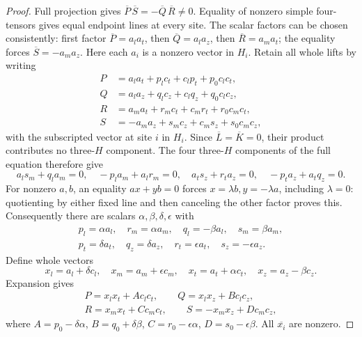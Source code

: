 \begin{proof}
Full projection gives
\(\overline P\,\overline S=-\overline Q\,\overline R\ne0\).
Equality of nonzero simple four-tensors gives equal endpoint lines at
every site.  The scalar factors can be chosen consistently: first factor
\(\overline P=a_la_t\), then \(\overline Q=a_la_z\), then
\(\overline R=a_ma_t\); the equality forces
\(\overline S=-a_ma_z\).  Here each \(a_i\) is a nonzero vector in \(H_i\).
Retain all whole lifts by writing
\[
\begin{aligned}
 P&=a_la_t+p_lc_t+c_lp_t+p_0c_lc_t,\\
 Q&=a_la_z+q_lc_z+c_lq_z+q_0c_lc_z,\\
 R&=a_ma_t+r_mc_t+c_mr_t+r_0c_mc_t,\\
 S&=-a_ma_z+s_mc_z+c_ms_z+s_0c_mc_z,
\end{aligned}
\]
with the subscripted vector at site \(i\) in \(H_i\).
Since \(\overline L=\overline K=0\), their product contributes no
three-\(H\) component.  The four three-\(H\) components of the full equation
therefore give
\[
 a_ls_m+q_la_m=0,\quad -p_la_m+a_lr_m=0,\quad
 a_ts_z+r_ta_z=0,\quad -p_ta_z+a_tq_z=0.
\]
For nonzero \(a,b\), an equality \(ax+yb=0\) forces
\(x=\lambda b,y=-\lambda a\), including \(\lambda=0\): quotienting by
either fixed line and then canceling the other factor proves this.
Consequently there are scalars \(\alpha,\beta,\delta,\epsilon\) with
\[
\begin{gathered}
 p_l=\alpha a_l,\quad r_m=\alpha a_m,\quad
 q_l=-\beta a_l,\quad s_m=\beta a_m,\\
 p_t=\delta a_t,\quad q_z=\delta a_z,\quad
 r_t=\epsilon a_t,\quad s_z=-\epsilon a_z.
\end{gathered}
\]
Define whole vectors
\[
 x_l=a_l+\delta c_l,\quad x_m=a_m+\epsilon c_m,\quad
 x_t=a_t+\alpha c_t,\quad x_z=a_z-\beta c_z.
\]
Expansion gives
\begin{equation}\label{atlas:cycle-residual}
 \begin{gathered}
 P=x_lx_t+A c_lc_t,\qquad Q=x_lx_z+B c_lc_z,\\
 R=x_mx_t+C c_mc_t,\qquad S=-x_mx_z+D c_mc_z,
 \end{gathered}
\end{equation}
where
\(A=p_0-\delta\alpha\), \(B=q_0+\delta\beta\),
\(C=r_0-\epsilon\alpha\), \(D=s_0-\epsilon\beta\).
All \(\overline{x_i}\) are nonzero.


\end{proof}

